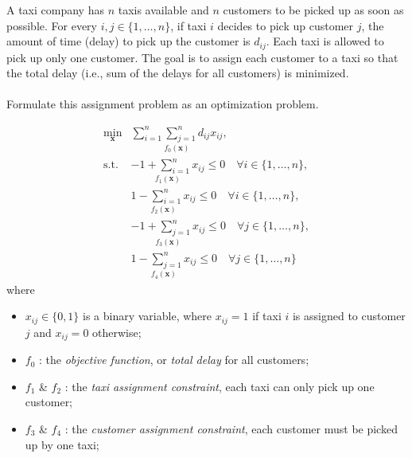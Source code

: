 \begin{homeworkProblem}
    
    A taxi company has $n$ taxis available and $n$ customers to be picked up as 
    soon as possible. For every $i, j \in \{1, \ldots, n\}$, if taxi $i$ decides 
    to pick up customer $j$, the amount of time (delay) to pick up the customer 
    is $d_{ij}$. Each taxi is allowed to pick up only one customer. The goal is 
    to assign each customer to a taxi so that the total delay (i.e., sum of the 
    delays for all customers) is minimized.
    \\ \\
    Formulate this assignment problem as an optimization problem.
    \\

    \begin{solution}
        \[
            \begin{array}{rl}
            \min\limits_{\boldsymbol{x}} & \underset{f_0(\boldsymbol{x})}{\boxed{\sum_{i=1}^{n} \sum_{j=1}^{n} d_{ij} x_{ij}}}, \\ [3ex]
            \text{s.t.} & \underset{f_1(\boldsymbol{x})}{\boxed{-1 + \sum_{i=1}^{n} x_{ij}}} \leq 0 \quad \forall i \in \{1, \dots, n\}, \\ [3ex]
                        & \underset{f_2(\boldsymbol{x})}{\boxed{1 - \sum_{i=1}^{n} x_{ij}}} \leq 0 \quad \forall i \in \{1, \dots, n\}, \\ [3ex]
                        & \underset{f_3(\boldsymbol{x})}{\boxed{-1 + \sum_{j=1}^{n} x_{ij}}} \leq 0 \quad \forall j \in \{1, \dots, n\}, \\ [3ex]
                        & \underset{f_4(\boldsymbol{x})}{\boxed{1 - \sum_{j=1}^{n} x_{ij}}} \leq 0 \quad \forall j \in \{1, \dots, n\}
            \end{array}
        \]
        where
        \begin{itemize}
            \item \(x_{ij} \in \{0, 1\}\) is a binary variable, where \(x_{ij} = 1\) if taxi \(i\) is assigned to customer \(j\) and \(x_{ij} = 0\) otherwise;
            \item $f_0$ : the \textit{objective function}, or \textit{total delay} for all customers;
            \item $f_1$ \& $f_2$ : the \textit{taxi assignment constraint}, each taxi can only pick up one customer;
            \item $f_3$ \& $f_4$ : the \textit{customer assignment constraint}, each customer must be picked up by one taxi;
        \end{itemize}

    \end{solution}
\end{homeworkProblem}